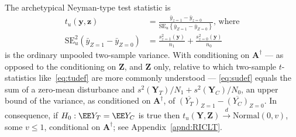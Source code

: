 The archetypical
Neyman-type test statistic \citeyearpar{neyman:1923,neyman1934stratifiedsampling} is
\begin{align} \label{eq:tudef}
t_{u}({\mathbf{y}},\mathbf{z}) &=
\frac{\bar{{y}}_{z=1} -
                             \bar{{y}}_{z=0}}{
\mathrm{SE}_{u} \left\{ \bar{{y}}_{Z=1} -  \bar{y}_{Z=0} \right\}
                             },\, \text{where}
\\
\mathrm{SE}_{u}^2 \left( \bar{y}_{Z=1} -  \bar{y}_{Z=0} \right) &= \frac{s_{z=1}^{2}({\mathbf{y}})}{n_{1}} +
    \frac{s_{z=0}^{2}({\mathbf{y}})}{n_{0}}  \label{eq:sudef}
\end{align}
is the ordinary unpooled two-sample variance. With conditioning on $\mathbf{A}^{\dagger}$ --- as opposed to the
conditioning on $\mathbf{Z}$, and $\mathbf{Z}$ only, relative to which
two-sample $t$-statistics like~\eqref{eq:tudef} are more commonly
understood --- \eqref{eq:sudef} equals the sum of a zero-mean
disturbance and
${s^{2}({\mathbf{Y}_{T}})}/{N_{1}} +
{s^{2}({\mathbf{Y}_{C}})}/{N_{0}}$, an upper bound of the variance, as
conditioned on $\mathbf{A}^{\dagger}$, of
$\overline{(Y_{T})}_{Z=1} - \overline{(Y_{C})}_{Z=0}$.  In consequence,
if $H_{0}: \EE Y_{T} =\EE Y_{C}$ is true then
$t_{u}(\mathbf{Y}, \mathbf{Z})\stackrel{d}{\rightarrow}\mathrm{Normal}(0,v)$,
some $v\leq 1$, conditional on $\mathbf{A}^{\dagger}$; see Appendix~\ref{apnd:RICLT}.%


